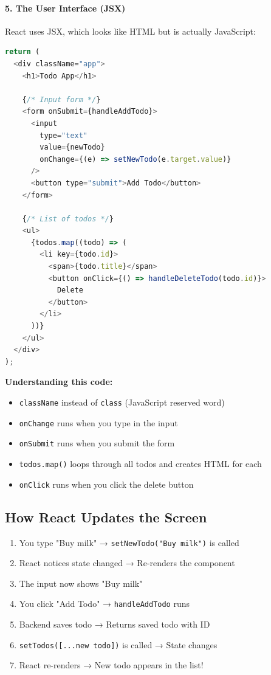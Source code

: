 \documentclass[12pt,a4paper]{article}
\begin{document}
\paragraph{5. The User Interface (JSX)}

React uses JSX, which looks like HTML but is actually JavaScript:

\begin{lstlisting}[language=JavaScript, caption=JSX Example]
return (
  <div className="app">
    <h1>Todo App</h1>
    
    {/* Input form */}
    <form onSubmit={handleAddTodo}>
      <input
        type="text"
        value={newTodo}
        onChange={(e) => setNewTodo(e.target.value)}
      />
      <button type="submit">Add Todo</button>
    </form>
    
    {/* List of todos */}
    <ul>
      {todos.map((todo) => (
        <li key={todo.id}>
          <span>{todo.title}</span>
          <button onClick={() => handleDeleteTodo(todo.id)}>
            Delete
          </button>
        </li>
      ))}
    </ul>
  </div>
);
\end{lstlisting}

\textbf{Understanding this code:}
\begin{itemize}
    \item \texttt{className} instead of \texttt{class} (JavaScript reserved word)
    \item \texttt{onChange} runs when you type in the input
    \item \texttt{onSubmit} runs when you submit the form
    \item \texttt{todos.map()} loops through all todos and creates HTML for each
    \item \texttt{onClick} runs when you click the delete button
\end{itemize}

\subsection{How React Updates the Screen}

\begin{enumerate}
    \item You type "Buy milk" → \texttt{setNewTodo("Buy milk")} is called
    \item React notices state changed → Re-renders the component
    \item The input now shows "Buy milk"
    \item You click "Add Todo" → \texttt{handleAddTodo} runs
    \item Backend saves todo → Returns saved todo with ID
    \item \texttt{setTodos([...new todo])} is called → State changes
    \item React re-renders → New todo appears in the list!
\end{enumerate}
\end{document}
